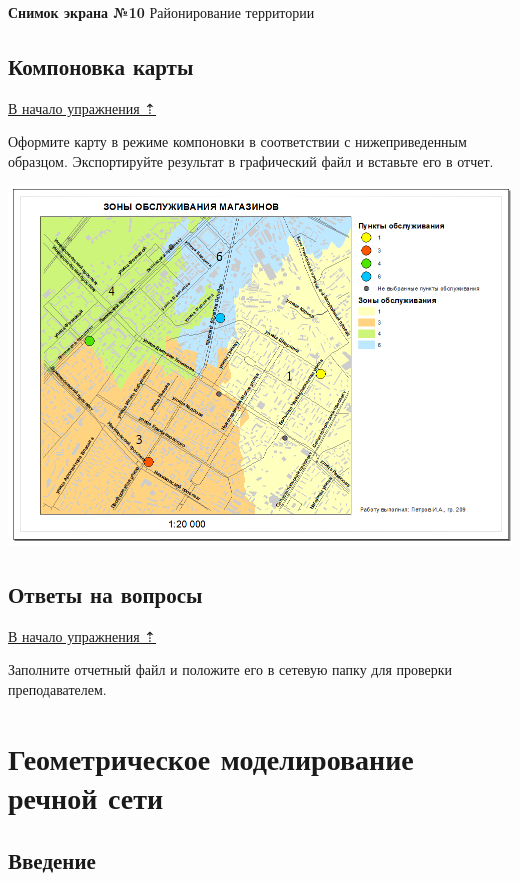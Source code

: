 \documentclass[]{book}
\theoremstyle{definition}
\theoremstyle{definition}
\theoremstyle{definition}
\theoremstyle{remark}
\begin{document}
\textbf{Снимок экрана №10} Районирование территории

\hypertarget{network-analysis-layout}{%
\section{Компоновка карты}\label{network-analysis-layout}}

\protect\hyperlink{network-analysis}{В начало упражнения ⇡}

Оформите карту в режиме компоновки в соответствии с нижеприведенным
образцом. Экспортируйте результат в графический файл и вставьте его в
отчет.

\includegraphics{images/Ex12/image36.png}

\hypertarget{network-analysis-questions}{%
\section{Ответы на вопросы}\label{network-analysis-questions}}

\protect\hyperlink{network-analysis}{В начало упражнения ⇡}

Заполните отчетный файл и положите его в сетевую папку для проверки
преподавателем.

\hypertarget{network-hydro}{%
\chapter{Геометрическое моделирование речной сети}\label{network-hydro}}

\hypertarget{network-hydro-intro}{%
\section{Введение}\label{network-hydro-intro}}
\end{document}
